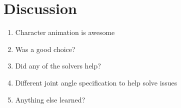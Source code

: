 
\section{Discussion}
\label{sec:Conclusion}

\begin{enumerate}
	\item Character animation is awesome
	\item Was \bulletPhysics a good choice?
	\item Did any of the solvers help?
	\item Different joint angle specification to help solve issues
	\item Anything else learned?
\end{enumerate}
